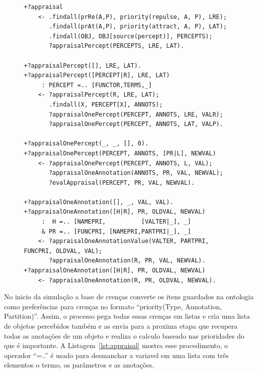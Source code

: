 \begin{figure}
\begin{center}
    \begin{minipage}{130mm}
	\lstset{linewidth=130mm}
	\begin{lstlisting}[frame=trbl,
caption=Amostra de código referente ao processo de avaliação considerando as
preferências.,
label=lst:appraisal]
+?appraisal
    <- .findall(prRe(A,P), priority(repulse, A, P), LRE);
       .findall(prAt(A,P), priority(attract, A, P), LAT);
       .findall(OBJ, OBJ[source(percept)], PERCEPTS);
       ?appraisalPercept(PERCEPTS, LRE, LAT).

+?appraisalPercept([], LRE, LAT).
+?appraisalPercept([PERCEPT|R], LRE, LAT)
     : PERCEPT =.. [FUNCTOR,TERMS,_]
    <- ?appraisalPercept(R, LRE, LAT);
       .findall(X, PERCEPT[X], ANNOTS);
       ?appraisalOnePercept(PERCEPT, ANNOTS, LRE, VALR);
       ?appraisalOnePercept(PERCEPT, ANNOTS, LAT, VALP).

+?appraisalOnePercept(_, _, [], 0).
+?appraisalOnePercept(PERCEPT, ANNOTS, [PR|L], NEWVAL)
    <- ?appraisalOnePercept(PERCEPT, ANNOTS, L, VAL);
       ?appraisalOneAnnotation(ANNOTS, PR, VAL, NEWVAL);
       ?evalAppraisal(PERCEPT, PR, VAL, NEWVAL).

+?appraisalOneAnnotation([], _, VAL, VAL).
+?appraisalOneAnnotation([H|R], PR, OLDVAL, NEWVAL)
     :  H =.. [NAMEPRI,          [VALTER|_], _]
     & PR =.. [FUNCPRI, [NAMEPRI,PARTPRI|_], _]
    <- ?appraisalOneAnnotationValue(VALTER, PARTPRI, FUNCPRI, OLDVAL, VAL);
       ?appraisalOneAnnotation(R, PR, VAL, NEWVAL).
+?appraisalOneAnnotation([H|R], PR, OLDVAL, NEWVAL)
    <- ?appraisalOneAnnotation(R, PR, OLDVAL, NEWVAL).
	\end{lstlisting}
    \end{minipage}
\end{center}
\end{figure}

No inicio da simulação a base de crenças converte os itens guardados na
ontologia como preferências para crenças no formato ``priority(Type,
Annotation, Partition)''. Assim, o processo pega todas essas crenças em listas
e cria uma lista de objetos percebidos também e as envia para a proxima etapa
que recupera todas as anotações de um objeto e realiza o calculo baseado nas
prioridades do que é importante. A Listagem~\ref{lst:appraisal} mostra esse
procedimento, o operador ``=..'' é usado para desmanchar a variavel em uma
lista com três elementos o termo, os parâmetros e as anotações.

